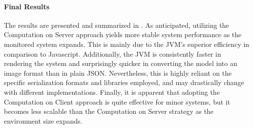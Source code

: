 \paragraph{Final Results}
The results are presented and summarized in . As anticipated, utilizing the Computation on Server approach yields more stable system performance as the monitored system expands. This is mainly due to the JVM's superior efficiency in comparison to Javascript. Additionally, the JVM is consistently faster in rendering the system and surprisingly quicker in converting the model into an image format than in plain JSON. Nevertheless, this is highly reliant on the specific serialization formats and libraries employed, and may drastically change with different implementations. Finally, it is apparent that adopting the Computation on Client approach is quite effective for minor systems, but it becomes less scalable than the Computation on Server strategy as the environment size expands.
